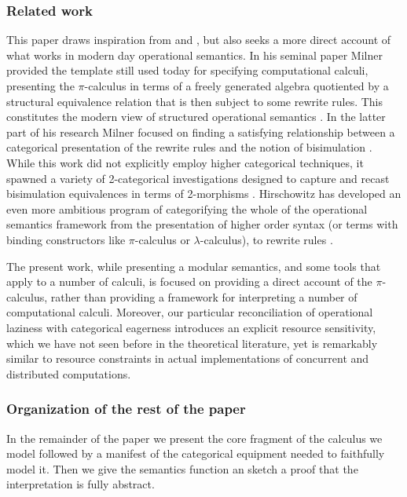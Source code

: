 \documentclass[]{acm_proc_article-sp}
\numberwithin{equation}{subsection}
\newcommand{\pic}{$\pi$-calculus}
\begin{document}
\subsubsection{Related work}


This paper draws inspiration from \cite{DBLP:conf/lics/Seely87} and
\cite{DBLP:journals/tcs/Hilken96}, but also seeks a more direct
account of what works in modern day operational semantics. In his
seminal paper \cite{DBLP:journals/mscs/Milner92} Milner provided the
template still used today for specifying computational calculi,
presenting the {\pic} in terms of a freely generated algebra
quotiented by a structural equivalence relation that is then subject
to some rewrite rules. This constitutes the modern view of structured
operational semantics \cite{Plotkin04theorigins}. In the latter part
of his research Milner focused on finding a satisfying relationship
between a categorical presentation of the rewrite rules and the notion
of bisimulation \cite{DBLP:conf/concur/LeiferM00}. While this work did
not explicitly employ higher categorical techniques, it spawned a
variety of 2-categorical investigations designed to capture and recast
bisimulation equivalences in terms of 2-morphisms
\cite{Sassone02derivingbisimulation}. Hirschowitz has developed an even
more ambitious program of categorifying the whole of the operational
semantics framework from the presentation of higher order syntax (or
terms with binding constructors like {\pic} or $\lambda$-calculus), to
rewrite rules \cite{hirschowitzcc2c}.

The present work, while presenting a modular semantics, and some tools
that apply to a number of calculi, is focused on providing a direct
account of the {\pic}, rather than providing a framework for
interpreting a number of computational calculi. Moreover, our
particular reconciliation of operational laziness with categorical
eagerness introduces an explicit resource sensitivity, which we have
not seen before in the theoretical literature, yet is remarkably
similar to resource constraints in actual implementations of
concurrent and distributed computations.

\subsubsection{Organization of the rest of the paper}

In the remainder of the paper we present the core fragment of the
calculus we model followed by a manifest of the categorical equipment
needed to faithfully model it. Then we give the semantics function an
sketch a proof that the interpretation is fully abstract.
\end{document}
